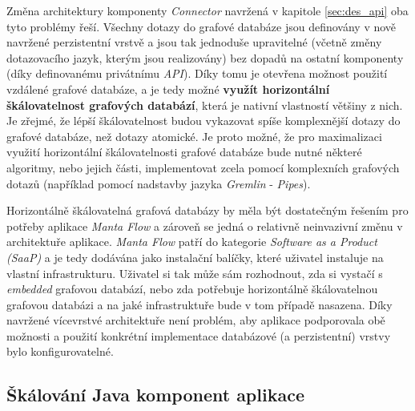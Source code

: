 Změna architektury komponenty \textit{Connector} navržená v kapitole \ref{sec:des_api} oba tyto problémy řeší. Všechny dotazy do grafové databáze jsou definovány v nově navržené perzistentní vrstvě a jsou tak jednoduše upravitelné (včetně změny dotazovacího jazyk, kterým jsou realizovány) bez dopadů na ostatní komponenty (díky definovanému privátnímu \textit{API}). %
Díky tomu je otevřena možnost použití vzdálené grafové databáze, a je tedy možné \textbf{využít horizontální škálovatelnost grafových databází}, která je nativní vlastností většiny z nich. Je zřejmé, že lépší škálovatelnost budou vykazovat spíše komplexnější dotazy do grafové databáze, než dotazy atomické. Je proto možné, že pro maximalizaci využití horizontální škálovatelnosti grafové databáze bude nutné některé algoritmy, nebo jejich části, implementovat zcela pomocí komplexních grafových dotazů (například pomocí nadstavby jazyka \textit{Gremlin} - \textit{Pipes}). %

Horizontálně škálovatelná grafová databázy by měla být dostatečným řešením pro potřeby aplikace \textit{Manta Flow} a zároveň se jedná o relativně neinvazivní změnu v architektuře aplikace. \textit{Manta Flow} patří do kategorie \textit{Software as a Product (SaaP)} a je tedy dodávána jako instalační balíčky, které uživatel instaluje na vlastní infrastrukturu. Uživatel si tak může sám rozhodnout, zda si vystačí s \textit{embedded} grafovou databází, nebo zda potřebuje horizontálně škálovatelnou grafovou databázi a na jaké infrastruktuře bude v tom případě nasazena. Díky navržené vícevrstvé architektuře není problém, aby aplikace podporovala obě možnosti a použití konkrétní implementace databázové (a perzistentní) vrstvy bylo konfigurovatelné.

\subsection{Škálování Java komponent aplikace}
\label{sec:des_scaling_java}

